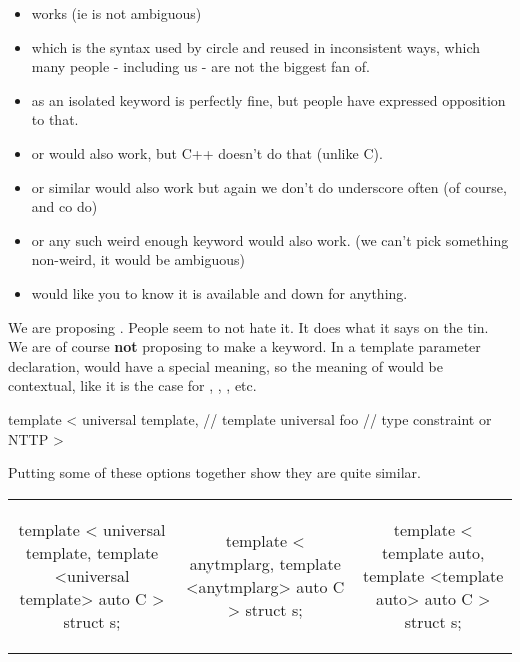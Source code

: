 \documentclass{wg21}
\begin{document}
\begin{itemize}

\item {} works (ie is not ambiguous)

\item {} which is the syntax used by circle and  reused  in inconsistent ways,
which many people - including us - are not the biggest fan of.

\item {} as an isolated keyword is perfectly fine, but people have expressed opposition to that.

\item {} or  would also work, but C++ doesn't do that (unlike C).

\item {} or similar would also work but again we don't do underscore often (of course,  and co do)

\item {} or any such weird enough keyword would also work. (we can't pick something non-weird, it would be ambiguous)

\item {} would like you to know it is available and down for anything.

\end{itemize}

We are proposing . People seem to not hate it. It does what it says on the tin.
We are of course \textbf{not} proposing to make  a keyword.
In a template parameter declaration,  would have a special meaning, so the meaning of  would be
contextual, like it is the case for , , , etc.


\begin{colorblock}
template <
        universal template, // template
        universal foo       // type constraint or NTTP
>
\end{colorblock}

Putting some of these options together show they are quite similar.

\begin{table}
\tiny
\hspace{-30pt}
\begin{tabular}{c | c | c}
\begin{colorblock}
template <
  universal template,
  template <universal template> auto C
>
struct s;
\end{colorblock}
&
\begin{colorblock}
template <
  anytmplarg,
  template <anytmplarg> auto C
>
struct s;
\end{colorblock}
&
\begin{colorblock}
template <
  template auto,
  template <template auto> auto C
>
struct s;
\end{colorblock}
\end{tabular}
\end{table}
\end{document}
